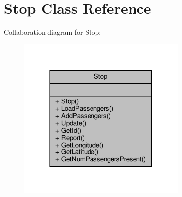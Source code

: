 \hypertarget{classStop}{}\section{Stop Class Reference}
\label{classStop}


Collaboration diagram for Stop\+:\nopagebreak
\begin{figure}[H]
\begin{center}
\leavevmode
\includegraphics[width=234pt]{classStop__coll__graph}
\end{center}
\end{figure}
